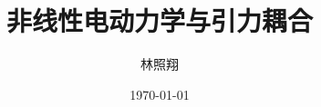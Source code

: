 \documentclass[aps,prl,preprint,groupedaddress]{revtex4-2}
\begin{document}

\title{非线性电动力学与引力耦合}


\author{林照翔}
\affiliation{}


\date{\today}
\end{document}
